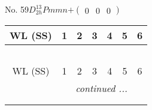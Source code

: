 \documentclass[fleqn,9pt,landscape]{jsarticle}
\begin{document}
\newpage
No. 59\quad$D_{2h}^{13}$\quad$Pmmn$\quad[ orthorhombic ]\quad$+\begin{pmatrix} 0 & 0 & 0 \end{pmatrix}$
\begin{center}
\renewcommand{\arraystretch}{1.2}
\begin{longtable}{ccccccc}
 \hline \hline
WL (SS) & 1 & 2 & 3 & 4 & 5 & 6 \\ \hline \endfirsthead

\multicolumn{6}{l}{\tablename\ \thetable{}} \\
 \hline \hline
WL (SS) & 1 & 2 & 3 & 4 & 5 & 6 \\ \hline \endhead

 \hline \hline
\multicolumn{6}{r}{\footnotesize\it continued ...} \\ \endfoot

 \hline \hline
\multicolumn{6}{r}{} \\ \endlastfoot


\end{longtable}
\end{center}
\end{document}
